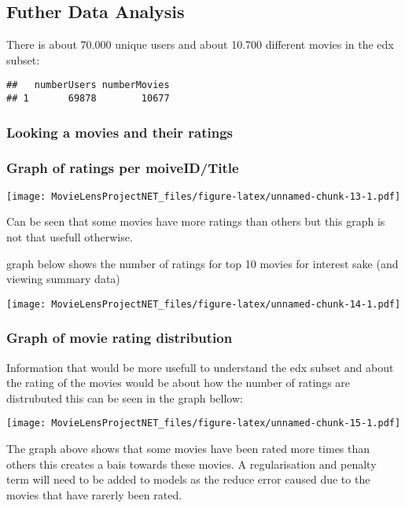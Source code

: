 \documentclass[
]{article}
\begin{document}
\hypertarget{futher-data-analysis}{%
\subsection{Futher Data Analysis}\label{futher-data-analysis}}

There is about 70.000 unique users and about 10.700 different movies in
the edx subset:

\begin{verbatim}
##   numberUsers numberMovies
## 1       69878        10677
\end{verbatim}

\hypertarget{looking-a-movies-and-their-ratings}{%
\subsubsection{Looking a movies and their
ratings}\label{looking-a-movies-and-their-ratings}}

\hypertarget{graph-of-ratings-per-moiveidtitle}{%
\subsubsection{Graph of ratings per
moiveID/Title}\label{graph-of-ratings-per-moiveidtitle}}

\texttt{[image: MovieLensProjectNET\_files/figure-latex/unnamed-chunk-13-1.pdf]}

Can be seen that some movies have more ratings than others but this
graph is not that usefull otherwise.

graph below shows the number of ratings for top 10 movies for interest
sake (and viewing summary data)

\texttt{[image: MovieLensProjectNET\_files/figure-latex/unnamed-chunk-14-1.pdf]}

\hypertarget{graph-of-movie-rating-distribution}{%
\subsubsection{Graph of movie rating
distribution}\label{graph-of-movie-rating-distribution}}

Information that would be more usefull to understand the edx subset and
about the rating of the movies would be about how the number of ratings
are distrubuted this can be seen in the graph bellow:

\texttt{[image: MovieLensProjectNET\_files/figure-latex/unnamed-chunk-15-1.pdf]}

The graph above shows that some movies have been rated more times than
others this creates a bais towards these movies. A regularisation and
penalty term will need to be added to models as the reduce error caused
due to the movies that have rarerly been rated.
\end{document}
